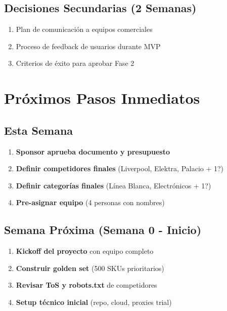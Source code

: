 \documentclass[12pt,a4paper]{article}
\begin{document}
\subsection{Decisiones Secundarias (2 Semanas)}

\begin{enumerate}[leftmargin=*, start=5]
    \item Plan de comunicación a equipos comerciales
    \item Proceso de feedback de usuarios durante MVP
    \item Criterios de éxito para aprobar Fase 2
\end{enumerate}

\section{Próximos Pasos Inmediatos}

\subsection{Esta Semana}
\begin{enumerate}[leftmargin=*]
    \item \textbf{Sponsor aprueba documento y presupuesto}
    \item \textbf{Definir competidores finales} (Liverpool, Elektra, Palacio + 1?)
    \item \textbf{Definir categorías finales} (Línea Blanca, Electrónicos + 1?)
    \item \textbf{Pre-asignar equipo} (4 personas con nombres)
\end{enumerate}

\subsection{Semana Próxima (Semana 0 - Inicio)}
\begin{enumerate}[leftmargin=*, start=5]
    \item \textbf{Kickoff del proyecto} con equipo completo
    \item \textbf{Construir golden set} (500 SKUs prioritarios)
    \item \textbf{Revisar ToS y robots.txt} de competidores
    \item \textbf{Setup técnico inicial} (repo, cloud, proxies trial)
\end{enumerate}
\end{document}
